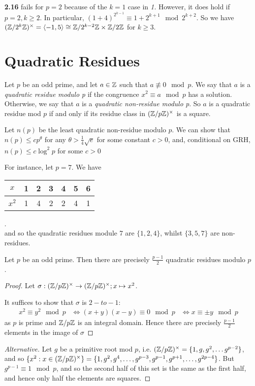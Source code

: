 \documentclass[10pt,a4paper]{article}
\begin{document}
\textbf{2.16} fails for $p=2$ because of the $k=1$ case in \textit{1.} However, it does hold if $p=2, k\geq 2$. In particular, $(1+4)^{2^{k-1}} \equiv 1+2^{k+1}\mod 2^{k+2}$. So we have $(\mathbb{Z}/2^k\mathbb{Z})^\times = \langle -1,5\rangle \cong \mathbb{Z}/2^{k-2}\mathbb{Z} \times \mathbb{Z}/2\mathbb{Z}$ for $k\geq 3$.

\section{Quadratic Residues}
Let $p$ be an odd prime, and let $a \in \mathbb{Z}$ such that $a \nequiv 0\mod p$. We say that $a$ is a \emph{quadratic residue modulo p} if the congruence $x^2 \equiv a \mod p$ has a solution.  Otherwise, we say that $a$ is a \emph{quadratic non-residue modulo p}. So $a$ is a quadratic residue mod $p$ if and only if its residue class in $(\mathbb{Z}/p\mathbb{Z})^\times$ is a square.

\begin{conjecture}[Open]
Let $n(p)$ be the least quadratic non-residue modulo $p$. We can show that $n(p) \leq cp^\theta$ for any $\theta > \frac{1}{4}\sqrt{e}$ for some constant $c>0$, and, conditional on GRH, $n(p)\leq c\log^2 p$ for some $c> 0$
\end{conjecture}

For instance, let $p=7$. We have \begin{tabular}{c|c|c|c|c|c|c}
$x$ & 1 & 2 & 3 & 4 & 5 & 6 \\ \hline
$x^2$ & 1 & 4 & 2 & 2 & 4 & 1
\end{tabular}.\\
and so the quadratic residues module $7$ are $\{1,2,4\}$, whilst $\{3,5,7\}$ are non-residues.

\begin{lemma}
Let $p$ be an odd prime. Then there are precisely $\frac{p-1}{2}$ quadratic residues modulo $p$.
\end{lemma}
\begin{proof}
Let $\sigma: (\mathbb{Z}/p\mathbb{Z})^\times \to (\mathbb{Z}/p\mathbb{Z})^\times; x \mapsto x^2$.

It suffices to show that $\sigma$ is $2-to-1$:
\begin{align*}
x^2 \equiv y^2 \mod p &\iff (x+y)(x-y) \equiv 0 \mod p
&\iff x \equiv \pm y \mod p
\end{align*}
as $p$ is prime and $\mathbb{Z}/p\mathbb{Z}$ is an integral domain. Hence there are precisely $\frac{p-1}{2}$ elements in the image of $\sigma$
\end{proof}
\begin{proof}[Alternative]
Let $g$ be a primitive root mod $p$, i.e. $(\mathbb{Z}/p\mathbb{Z})^\times = \{1,g,g^2, \ldots g^{p-2}\}$, and so $\{x^2:x \in (\mathbb{Z}/p\mathbb{Z})^\times\} = \{1,g^2,g^4,\ldots, g^{p-3}, g^{p-1}, g^{p+1}, \ldots, g^{2p-4}\}$. But $g^{p-1} \equiv 1 \mod p$, and so the second half of this set is the same as the first half, and hence only half the elements are squares.
\end{proof}
\end{document}
